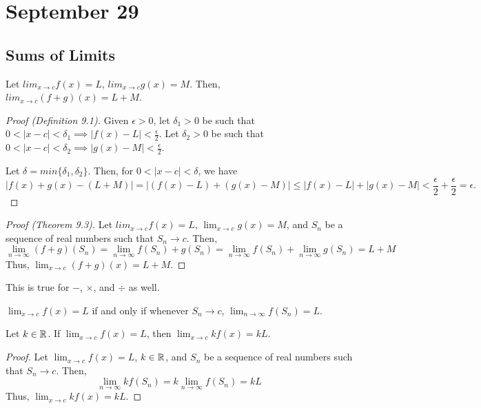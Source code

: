 \chapter{September 29}

\section{Sums of Limits}
\begin{theorem}{}{}
    Let $lim_{x \to c} f(x) = L$, $lim_{x \to c} g(x) = M$. Then, $lim_{x \to c} (f + g)(x) = L + M$.
\end{theorem}
\begin{proof}[Proof (Definition 9.1)]
    Given $\epsilon > 0$, let $\delta_1 > 0$ be such that $0 < |x - c| < \delta_1 \implies |f(x) - L| < \frac{\epsilon}{2}$. Let $\delta_2 > 0$ be such that $0 < |x - c| < \delta_2 \implies |g(x) - M| < \frac{\epsilon}{2}$.

    Let $\delta = min\{\delta_1, \delta_2\}$. Then, for $0 < |x - c| < \delta$, we have $$|f(x) + g(x) - (L + M)| = |(f(x) - L) + (g(x) - M)| \leq |f(x) - L| + |g(x) - M| < \frac{\epsilon}{2} + \frac{\epsilon}{2} = \epsilon.$$
\end{proof}
\begin{proof}[Proof (Theorem 9.3)]
    Let $lim_{x \to c} f(x) = L$, $\lim_{x \to c} g(x) = M$, and $S_n$ be a sequence of real numbers such that $S_n \to c$. Then, $$\lim_{n \to \infty} (f + g)(S_n) = \lim_{n \to \infty} f(S_n) + g(S_n) = \lim_{n \to \infty} f(S_n) + \lim_{n \to \infty} g(S_n) = L + M$$ Thus, $\lim_{x \to c} (f + g)(x) = L + M$.
\end{proof}
\begin{note}
    This is true for $-$, $\times$, and $\div$ as well.
\end{note}

\begin{definition}
    $\lim_{x \to c} f(x) = L$ if and only if whenever $S_n \to c$, $\lim_{n \to \infty} f(S_n) = L$.
\end{definition}

\begin{theorem}
    Let $k \in \mathbb{R}$. If $\lim_{x \to c} f(x) = L$, then $\lim_{x \to c} kf(x) = kL$.
\end{theorem}
\begin{proof}
    Let $\lim_{x \to c} f(x) = L$, $k \in \mathbb{R}$, and $S_n$ be a sequence of real numbers such that $S_n \to c$. Then, $$\lim_{n \to \infty} kf(S_n) = k\lim_{n \to \infty} f(S_n) = kL$$ Thus, $\lim_{x \to c} kf(x) = kL$.
\end{proof}

